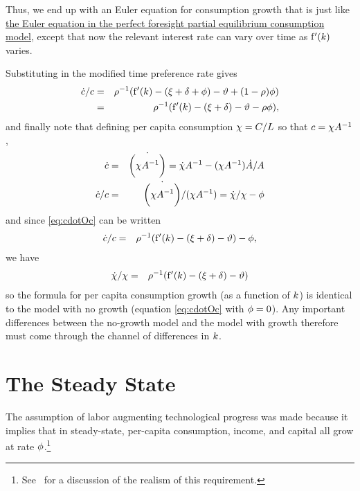 \documentclass{handout}
\begin{document}
Thus, we end up with an Euler equation for consumption growth that is
just like \href{http://www.econ2.jhu.edu/people/ccarroll/public/LectureNotes/Consumption/PerfForesightCRRA/#EulerCGroFac}{the Euler equation in the perfect foresight partial equilibrium consumption model}, except that now the relevant interest rate can vary over
time as $\mathrm{f}^{\prime}({k})$ varies.

Substituting in the modified time preference rate gives
\begin{eqnarray}
  \dot{c}/c  & = & \rho^{-1}(\mathrm{f}^{\prime}({k})-(\xi+\delta+\phi)-\vartheta  +(1- \rho) \phi)
  \\   & = & \rho^{-1}(\mathrm{f}^{\prime}({k})-(\xi+\delta)-\vartheta  - \rho \phi), \label{eq:cdotOc}
\end{eqnarray}
and finally note that defining per capita consumption $\chi = C/L$
so that $c = \chi A ^{-1}$, 
\begin{eqnarray}
  \label{eq:chiDotOchi}
  \dot{c} & = & \dot{\biggl(\chi A ^{-1}\biggr)} =  \dot{\chi}A ^{-1}-(\chi A ^{-1})\dot{A }/A 
  \\ \dot{c}/c & = & \dot{\biggl(\chi A ^{-1}\biggr)}/(\chi A^{-1}) =  \dot{\chi}/\chi - \phi 
\end{eqnarray}
and since \eqref{eq:cdotOc} can be written
\begin{eqnarray}
  \dot{c}/c  & = & \rho^{-1}(\mathrm{f}^{\prime}({k})-(\xi+\delta)-\vartheta ) - \phi,
\end{eqnarray}
we have
\begin{eqnarray}
  \dot{\chi}/\chi & = & \rho^{-1}(\mathrm{f}^{\prime}({k})-(\xi+\delta)-\vartheta )
\end{eqnarray}
so the formula for per capita consumption growth (as a function of
${k}$) is identical to the model with no growth (equation
\eqref{eq:cdotOc} with $\phi=0$).  Any important differences between
the no-growth model and the model with growth therefore must come
through the channel of differences in ${k}$.


\section{The Steady State}

The assumption of labor augmenting technological progress was made 
because it implies that in steady-state, per-capita consumption, income,
and capital all grow at rate $\phi$.\footnote{See~\cite{ghosDespiteUzawa} for a discussion of the realism of this requirement.}
\end{document}
